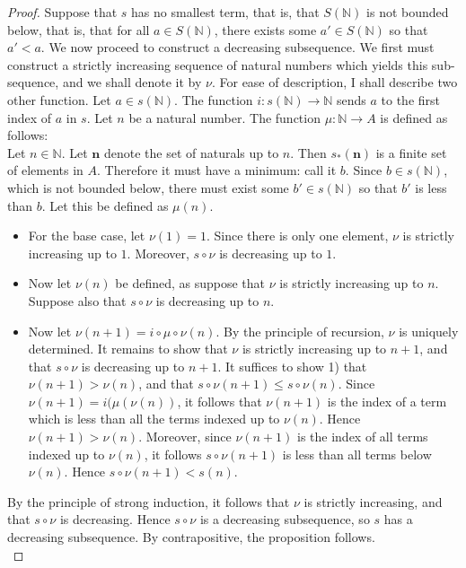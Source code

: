 \documentclass[11pt]{article}
\newcommand{\N}{\mathbb{N}}
\theoremstyle{definition}
\begin{document}
\begin{proof}
Suppose that $s$ has no smallest term, that is, that $S(\N)$ is not bounded below, that is, that for all $a\in S(\N)$, there exists some $a'\in S(\N)$ so that $a'< a$. We now proceed to construct a decreasing subsequence. We first must construct a strictly increasing sequence of natural numbers which yields this sub-sequence, and we shall denote it by $\nu$. For ease of description, I shall describe two other function. Let $a\in s(\N)$. The function $i:s(\N)\to \N$ sends $a$ to the first index of $a$ in $s$. Let $n$ be a natural number. The function $\mu: \N \to A$ is defined as follows:\\
Let $n\in \N$. Let $\mathbf{n}$ denote the set of naturals up to $n$. Then $ s_*(\mathbf{n})$ is a finite set of elements in $A$. Therefore it must have a minimum: call it $b$. Since $b\in s(\N)$, which is not bounded below, there must exist some $b'\in s(\N)$ so that $b'$ is less than $b$. Let this be defined as $\mu(n)$. 


\begin{itemize}
\item For the base case, let $\nu(1) = 1$. Since there is only one element, $\nu$ is strictly increasing up to $1$. Moreover, $s\circ\nu$ is decreasing up to $1$. 
\item Now let $\nu(n)$ be defined, as suppose that $\nu$ is strictly increasing up to $n$. Suppose also that $s\circ \nu$ is decreasing up to $n$. 
\item Now let $\nu(n+1) = i\circ \mu\circ \nu(n)$. By the principle of recursion, $\nu$ is uniquely determined. It remains to show that $\nu$ is strictly increasing up to $n+1$, and that $s\circ \nu$ is decreasing up to $n+1$.
It suffices to show 1) that $\nu(n+1) > \nu(n)$, and that $s\circ\nu(n+1) \le s\circ \nu(n)$. Since $\nu(n+1) = i(\mu(\nu(n))$, it follows that $\nu(n+1)$ is the index of a term which is less than all the terms indexed up to $\nu(n)$. Hence $\nu(n+1) > \nu(n)$. Moreover, since $\nu(n+1)$ is the index of all terms indexed up to $\nu(n)$, it follows $s\circ \nu(n+1)$ is less than all terms below $\nu(n)$. Hence $s\circ\nu(n+1) < s(n)$. 
\end{itemize}
By the principle of strong induction, it follows that $\nu$ is strictly increasing, and that $s\circ \nu$ is decreasing. Hence $s\circ \nu$ is a decreasing subsequence, so $s$ has a decreasing subsequence. By contrapositive, the proposition follows.\\

\end{proof}
\end{document}
